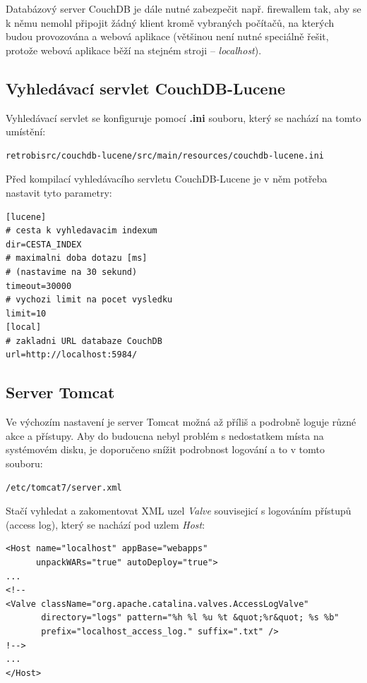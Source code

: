 Databázový server CouchDB je dále nutné zabezpečit např. firewallem tak, aby se k němu nemohl připojit žádný klient kromě vybraných počítačů, na kterých budou provozována  a webová aplikace (většinou není nutné speciálně řešit, protože webová aplikace běží na stejném stroji -- {\em localhost}).

\subsection{Vyhledávací servlet CouchDB-Lucene}

Vyhledávací servlet se konfiguruje pomocí {\bf .ini} souboru, který se nachází na tomto umístění:

\begin{verbatim}
retrobisrc/couchdb-lucene/src/main/resources/couchdb-lucene.ini
\end{verbatim}

Před kompilací vyhledávacího servletu CouchDB-Lucene je v něm potřeba nastavit tyto parametry:

\begin{verbatim}
[lucene]
# cesta k vyhledavacim indexum
dir=CESTA_INDEX
# maximalni doba dotazu [ms]
# (nastavime na 30 sekund)
timeout=30000
# vychozi limit na pocet vysledku
limit=10
[local]
# zakladni URL databaze CouchDB
url=http://localhost:5984/
\end{verbatim}

\subsection{Server Tomcat}

Ve výchozím nastavení je server Tomcat možná až příliš  a podrobně loguje různé akce a přístupy. Aby do budoucna nebyl problém s nedostatkem místa na systémovém disku, je doporučeno snížit podrobnost logování a to v tomto souboru:

\begin{verbatim}
/etc/tomcat7/server.xml
\end{verbatim}

Stačí vyhledat a zakomentovat XML uzel {\em Valve} souvisejicí s logováním přístupů (access log), který se nachází pod uzlem {\em Host}:

\begin{verbatim}
<Host name="localhost" appBase="webapps" 
      unpackWARs="true" autoDeploy="true">
...
<!--
<Valve className="org.apache.catalina.valves.AccessLogValve" 
       directory="logs" pattern="%h %l %u %t &quot;%r&quot; %s %b"
       prefix="localhost_access_log." suffix=".txt" />
!-->
...
</Host>
\end{verbatim}

